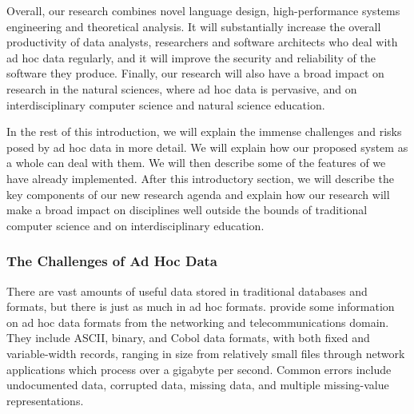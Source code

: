 \documentclass[11pt]{article}
\begin{document}
Overall, our research combines novel language design, high-performance
systems engineering and theoretical analysis.  It will substantially
increase the overall productivity of data analysts, researchers and
software architects who deal with ad hoc data regularly, and it will
improve the security and reliability of the software they produce.
Finally, our research will also have a broad impact on research in the
natural sciences, where ad hoc data is pervasive, and on
interdisciplinary computer science and natural science education.

In the rest of this introduction, we will explain the immense
challenges and risks posed by ad hoc data in more detail.  We will
explain how our proposed system as a whole can deal with them.  We
will then describe some of the features of \pads{} we have already
implemented.  After this introductory section, we will describe the
key components of our new research agenda and explain how our research
will make a broad impact on disciplines well outside the bounds of
traditional computer science and on interdisciplinary education.

\subsubsection{The Challenges of Ad Hoc Data}

There are vast amounts of useful data stored in
traditional databases and \xml{} formats, but there is just as much in
ad hoc formats.   provide some information
on ad hoc data formats from the networking and telecommunications domain.  
They include ASCII, binary, and Cobol data formats, with
both fixed and variable-width records, ranging in size from
relatively small files through network applications which process over
a gigabyte per second.  Common errors include undocumented data,
corrupted data, missing data, and multiple missing-value
representations.
\end{document}
